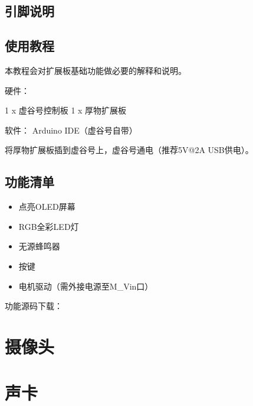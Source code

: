 \documentclass[letterpaper,10pt,english]{sphinxmanual}
\begin{document}
\subsection{引脚说明}
\label{\detokenize{07.plus/7.1-houwu:id5}}
\noindent{}

\noindent{}


\subsection{使用教程}
\label{\detokenize{07.plus/7.1-houwu:id6}}
本教程会对扩展板基础功能做必要的解释和说明。


硬件：

1 x 虚谷号控制板
1 x 厚物扩展板

软件：
Arduino IDE（虚谷号自带）

将厚物扩展板插到虚谷号上，虚谷号通电（推荐5V@2A USB供电）。


\subsection{功能清单}
\label{\detokenize{07.plus/7.1-houwu:id7}}\begin{itemize}
\item {} 
点亮OLED屏幕

\item {} 
RGB全彩LED灯

\item {} 
无源蜂鸣器

\item {} 
按键

\item {} 
电机驱动（需外接电源至M\_Vin口）

\end{itemize}

功能源码下载：


\section{摄像头}
\label{\detokenize{07.plus/7.2:id1}}\label{\detokenize{07.plus/7.2::doc}}

\section{声卡}
\label{\detokenize{07.plus/7.3:id1}}\label{\detokenize{07.plus/7.3::doc}}
\end{document}
